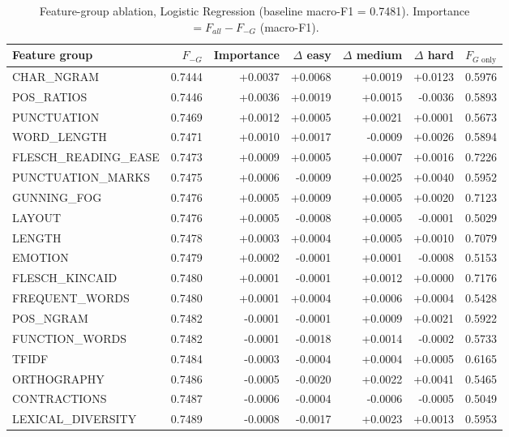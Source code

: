 \begin{table}[ht]
\centering
\small
\caption{Feature-group ablation, Logistic Regression (baseline macro-F1 = 0.7481). Importance $= F_{all} - F_{-G}$ (macro-F1).}
\label{tab:ablation-features-logistic}
\begin{tabular}{lrrrrrr}
\toprule
Feature group & $F_{-G}$ & Importance & $\Delta$ easy & $\Delta$ medium & $\Delta$ hard & $F_{G\text{ only}}$ \\
\midrule
CHAR\_NGRAM & 0.7444 & +0.0037 & +0.0068 & +0.0019 & +0.0123 & 0.5976 \\
POS\_RATIOS & 0.7446 & +0.0036 & +0.0019 & +0.0015 & -0.0036 & 0.5893 \\
PUNCTUATION & 0.7469 & +0.0012 & +0.0005 & +0.0021 & +0.0001 & 0.5673 \\
WORD\_LENGTH & 0.7471 & +0.0010 & +0.0017 & -0.0009 & +0.0026 & 0.5894 \\
FLESCH\_READING\_EASE & 0.7473 & +0.0009 & +0.0005 & +0.0007 & +0.0016 & 0.7226 \\
PUNCTUATION\_MARKS & 0.7475 & +0.0006 & -0.0009 & +0.0025 & +0.0040 & 0.5952 \\
GUNNING\_FOG & 0.7476 & +0.0005 & +0.0009 & +0.0005 & +0.0020 & 0.7123 \\
LAYOUT & 0.7476 & +0.0005 & -0.0008 & +0.0005 & -0.0001 & 0.5029 \\
LENGTH & 0.7478 & +0.0003 & +0.0004 & +0.0005 & +0.0010 & 0.7079 \\
EMOTION & 0.7479 & +0.0002 & -0.0001 & +0.0001 & -0.0008 & 0.5153 \\
FLESCH\_KINCAID & 0.7480 & +0.0001 & -0.0001 & +0.0012 & +0.0000 & 0.7176 \\
FREQUENT\_WORDS & 0.7480 & +0.0001 & +0.0004 & +0.0006 & +0.0004 & 0.5428 \\
POS\_NGRAM & 0.7482 & -0.0001 & -0.0001 & +0.0009 & +0.0021 & 0.5922 \\
FUNCTION\_WORDS & 0.7482 & -0.0001 & -0.0018 & +0.0014 & -0.0002 & 0.5733 \\
TFIDF & 0.7484 & -0.0003 & -0.0004 & +0.0004 & +0.0005 & 0.6165 \\
ORTHOGRAPHY & 0.7486 & -0.0005 & -0.0020 & +0.0022 & +0.0041 & 0.5465 \\
CONTRACTIONS & 0.7487 & -0.0006 & -0.0004 & -0.0006 & -0.0005 & 0.5049 \\
LEXICAL\_DIVERSITY & 0.7489 & -0.0008 & -0.0017 & +0.0023 & +0.0013 & 0.5953 \\
\bottomrule
\end{tabular}
\end{table}

